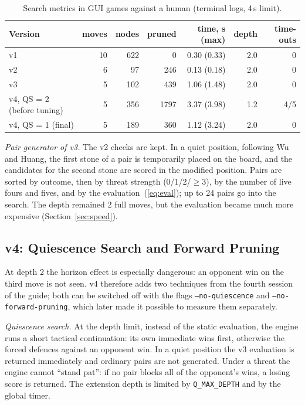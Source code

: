 \documentclass[a4paper,10pt,twocolumn]{article}
\newcommand{\code}[1]{\texttt{#1}}
\begin{document}
\begin{table}[b]
\centering
\caption{Search metrics in GUI games against a human (terminal logs, 4\,s limit).}
\label{tab:gui}
\begin{tabular}{@{}lrrrrrr@{}}
\toprule
Version & moves & nodes & pruned & time, s (max) & depth & time-outs \\
\midrule
v1 & 10 & 622 & 0 & 0.30 (0.33) & 2.0 & 0 \\
v2 & 6 & 97 & 246 & 0.13 (0.18) & 2.0 & 0 \\
v3 & 5 & 102 & 439 & 1.06 (1.48) & 2.0 & 0 \\
v4, QS = 2 (before tuning) & 5 & 356 & 1797 & 3.37 (3.98) & 1.2 & 4/5 \\
v4, QS = 1 (final) & 5 & 189 & 360 & 1.12 (3.24) & 2.0 & 0 \\
\bottomrule
\end{tabular}
\end{table}

\emph{Pair generator of v3.} The v2 checks are kept. In a quiet position, following Wu and Huang, the first stone of a pair is temporarily placed on the board, and the candidates for the second stone are scored in the modified position. Pairs are sorted by outcome, then by threat strength (0/1/2/$\ge3$), by the number of live fours and fives, and by the evaluation~(\ref{eq:eval}); up to 24 pairs go into the search. The depth remained 2 full moves, but the evaluation became much more expensive (Section~\ref{sec:speed}).

\subsection{v4: Quiescence Search and Forward Pruning}\label{sec:v4}
At depth 2 the horizon effect is especially dangerous: an opponent win on the third move is not seen. v4 therefore adds two techniques from the fourth session of the guide; both can be switched off with the flags \code{--no-quiescence} and \code{--no-forward-pruning}, which later made it possible to measure them separately.

\emph{Quiescence search.} At the depth limit, instead of the static evaluation, the engine runs a short tactical continuation: its own immediate wins first, otherwise the forced defences against an opponent win. In a quiet position the v3 evaluation is returned immediately and ordinary pairs are not generated. Under a threat the engine cannot ``stand pat'': if no pair blocks all of the opponent's wins, a losing score is returned. The extension depth is limited by \code{Q\_MAX\_DEPTH} and by the global timer.
\end{document}
